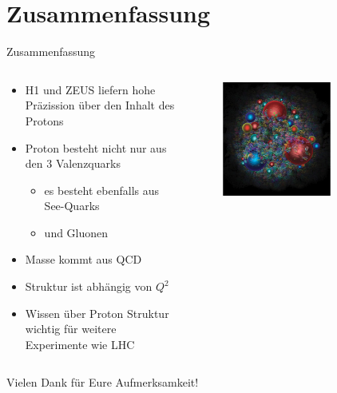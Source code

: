 \documentclass[aspectratio=1610, 9pt]{beamer}
\begin{document}
\section{Zusammenfassung}
\begin{frame}{Zusammenfassung}
  \begin{columns}
    \begin{column}{0.4\textwidth}
      \begin{itemize}
        \item{H1 und ZEUS liefern hohe Präzission über den Inhalt des Protons}
        \item{Proton besteht nicht nur aus den 3 Valenzquarks}
        \begin{itemize}
          \item{es besteht ebenfalls aus See-Quarks}
          \item{und Gluonen}
        \end{itemize}
        \item{Masse kommt aus QCD}
        \item{Struktur ist abhängig von $Q^2$}
        \item{Wissen über Proton Struktur wichtig für weitere Experimente wie LHC}
      \end{itemize}
    \end{column}

    \begin{column}{0.6\textwidth}
      \begin{figure}
        \centering
        \includegraphics[width=0.7\textwidth]{images/proton-courier.png}
      \end{figure}
    \end{column}
  \end{columns}
\end{frame}

\begin{frame}
\centering
\Huge{Vielen Dank für Eure Aufmerksamkeit!}
\end{frame}
\end{document}
